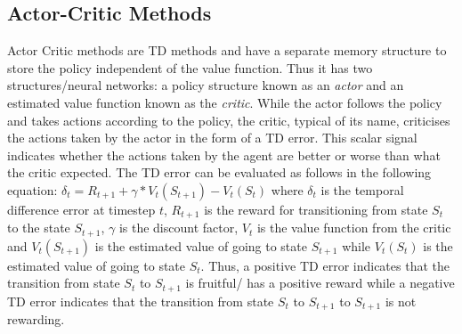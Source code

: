 \documentclass{article}
\begin{document}




\subsection{Actor-Critic Methods}
 Actor Critic methods are TD methods and have a separate memory structure to store the policy independent of the value function. Thus it has two  structures/neural networks: a policy structure known as an \emph{actor} and an estimated value function known as the \emph{critic}. While the actor follows the policy and takes actions according to the policy, the critic, typical of its name, criticises the actions taken by the actor in the form of a TD error. This scalar signal indicates whether the actions taken by the agent are better or worse than what the critic expected. The TD error can be evaluated as follows in the following equation: \newline
 $\delta_{t} = R_{t+1} + \gamma * V_t(S_{t+1})-V_t(S_t)$ \newline
 where $\delta_{t}$ is the temporal difference error at timestep $t$, $R_{t+1}$ is the reward for transitioning from state $S_t$ to the state $S_{t+1}$,  $\gamma$ is the discount factor, $V_{t}$ is the value function from the critic and $V_t(S_{t+1})$ is the estimated value of going to state $S_{t+1}$ while $V_t(S_t)$ is the estimated value of going to state $S_t$.  \newline 
 Thus, a positive TD error indicates that the transition from state $S_t$ to $S_{t+1}$ is fruitful/ has a positive reward while a negative TD error indicates that the transition from state  $S_t$ to $S_{t+1}$ to $S_{t+1}$ is not rewarding.
 \newline
\end{document}
